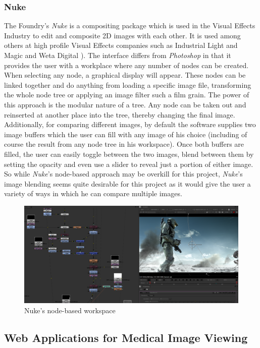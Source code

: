 \documentclass[a4paper,11pt,titlepage]{article}
\begin{document}
\subsubsection{Nuke}
The Foundry's \textit{Nuke} is a compositing package which is used in the Visual Effects Industry to edit and composite 2D images with each other. It is used among others at high profile Visual Effects companies such as Industrial Light and Magic and Weta Digital\cite{nuke1} \cite{nuke2}). The interface differs from \textit{Photoshop} in that it provides the user with a workplace where any number of nodes can be created. When selecting any node, a graphical display will appear. These nodes can be linked together and do anything from loading a specific image file, transforming the whole node tree or applying an image filter such a film grain. The power of this approach is the modular nature of a tree. Any node can be taken out and reinserted at another place into the tree, thereby changing the final image. Additionally, for comparing different images, by default the software supplies two image buffers which the user can fill with any image of his choice (including of course the result from any node tree in his workspace). Once both buffers are filled, the user can easily toggle between the two images, blend between them by setting the opacity and even use a slider to reveal just a portion of either image. So while \textit{Nuke}'s node-based approach may be overkill for this project, \textit{Nuke}'s image blending seems quite desirable for this project as it would give the user a variety of ways in which he can compare multiple images. 


\begin{figure}[ht!]
\centering
\includegraphics[width=170mm]{..//literatureSurvey/graphics/nuke_02.png}
\caption{Nuke's node-based workspace}
\label{fig:UIdesign1}
\end{figure}


\subsection{Web Applications for Medical Image Viewing}
\end{document}
